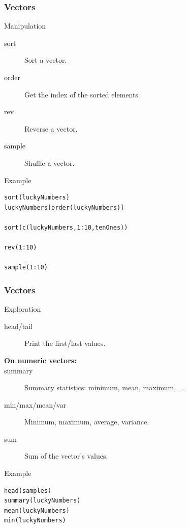 \documentclass[10pt]{beamer}
\newenvironment{xframe}[2][]
  {\begin{frame}[fragile,environment=xframe,#1]
  \frametitle{#2}}
  {\end{frame}}
\begin{document}
\begin{xframe}[shrink=5]{Vectors}
  \begin{block}{Manipulation}
    \begin{description}
    \item[sort] Sort a vector.
    \item[order] Get the index of the sorted elements.
    \item[rev] Reverse a vector.
    \item[sample] Shuffle a vector.
    \end{description}
  \end{block}
  \begin{exampleblock}{Example}
\begin{verbatim}
sort(luckyNumbers)
luckyNumbers[order(luckyNumbers)]

sort(c(luckyNumbers,1:10,tenOnes))

rev(1:10)

sample(1:10)
\end{verbatim}
  \end{exampleblock}
\end{xframe}


\begin{xframe}{Vectors}
  \begin{block}{Exploration}
    \begin{description}
    \item[head/tail] Print the first/last values.
      \medskip
    \item[{\bf\small On numeric vectors:}]
    \item[summary] Summary statistics: minimum, mean, maximum, ...
    \item[min/max/mean/var] Minimum, maximum, average, variance.
    \item[sum] Sum of the vector's values.
    \end{description}
  \end{block}
  \begin{exampleblock}{Example}
\begin{verbatim}
head(samples)
summary(luckyNumbers)
mean(luckyNumbers)
min(luckyNumbers)
\end{verbatim}
  \end{exampleblock}
\end{xframe}
\end{document}
